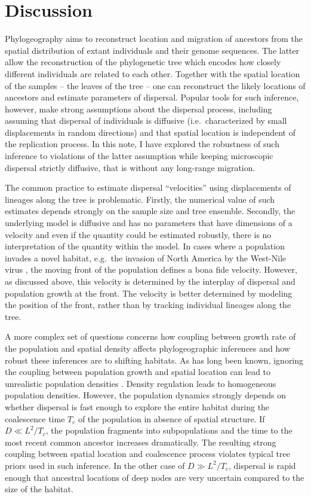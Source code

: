 \documentclass[aps,rmp, twocolumn]{revtex4}
\begin{document}
\section*{Discussion}
Phylogeography aims to reconstruct location and migration of ancestors from the spatial distribution of extant individuals and their genome sequences.
The latter allow the reconstruction of the phylogenetic tree which encodes how closely different individuals are related to each other.
Together with the spatial location of the samples -- the leaves of the tree -- one can reconstruct the likely locations of ancestors and estimate parameters of dispersal.
Popular tools for such inference, however, make strong assumptions about the dispersal process, including assuming that dispersal of individuals is diffusive (i.e.~characterized by small displacements in random directions) and that spatial location is independent of the replication process.
In this note, I have explored the robustness of such inference to violations of the latter assumption while keeping microscopic dispersal strictly diffusive, that is without any long-range migration.

The common practice to estimate dispersal ``velocities'' using displacements of lineages along the tree \citep{dellicour_relax_2021} is problematic.
Firstly, the numerical value of such estimates depends strongly on the sample size and tree ensemble.
Secondly, the underlying model is diffusive and has no parameters that have dimensions of a velocity and even if the quantity could be estimated robustly, there is no interpretation of the quantity within the model.
In cases where a population invades a novel habitat, e.g.~the invasion of North America by the West-Nile virus \citep{pybus_unifying_2012}, the moving front of the population defines a bona fide velocity.
However, as discussed above, this velocity is determined by the interplay of dispersal and population growth at the front.
The velocity is better determined by modeling the position of the front, rather than by tracking individual lineages along the tree.


A more complex set of questions concerns how coupling between growth rate of the population and spatial density affects phylogeographic inferences and how robust these inferences are to shifting habitats.
As has long been known, ignoring the coupling between population growth and spatial location can lead to unrealistic population densities \citep{felsenstein_pain_1975}.
Density regulation leads to homogeneous population densities.
However, the population dynamics strongly depends on whether dispersal is fast enough to explore the entire habitat during the coalescence time $T_c$ of the population in absence of spatial structure.
If $D\ll L^2/T_c$, the population fragments into subpopulations and the time to the most recent common ancestor increases dramatically.
The resulting strong coupling between spatial location and coalescence process violates typical tree priors used in such inference.
In the other case of $D\gg L^2/T_c$, dispersal is rapid enough that ancestral locations of deep nodes are very uncertain compared to the size of the habitat.
\end{document}
